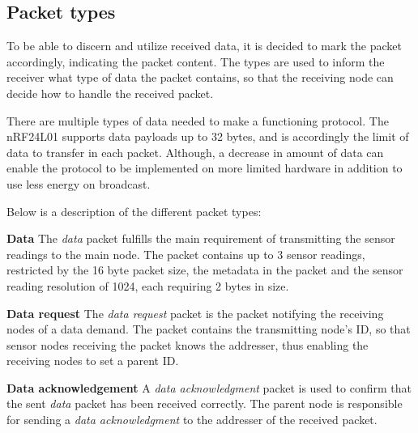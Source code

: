 \subsection{Packet types}
To be able to discern and utilize received data, it is decided to mark the packet accordingly, indicating the packet content.
The types are used to inform the receiver what type of data the packet contains, so that the receiving node can decide how to handle the received packet. 

There are multiple types of data needed to make a functioning protocol. The nRF24L01 supports data payloads up to 32 bytes, and is accordingly the limit of data to transfer in each packet.
Although, a decrease in amount of data can enable the protocol to be implemented on more limited hardware in addition to use less energy on broadcast.

Below is a description of the different packet types:

\textbf{Data}\newline
The \textit{data} packet fulfills the main requirement of transmitting the sensor readings to the main node. The packet contains up to 3 sensor readings, restricted by the 16 byte packet size, the metadata in the packet and the sensor reading resolution of 1024, each requiring 2 bytes in size.

\textbf{Data request}\newline %
The \textit{data request} packet is the packet notifying the receiving nodes of a data demand. 
The packet contains the transmitting node's ID, so that sensor nodes receiving the packet knows the addresser, thus enabling the receiving nodes to set a parent ID.



\textbf{Data acknowledgement}\newline
A \textit{data acknowledgment} packet is used to confirm that the sent \textit{data} packet has been received correctly. The parent node is responsible for sending a \textit{data acknowledgment} to the addresser of the received packet. 

